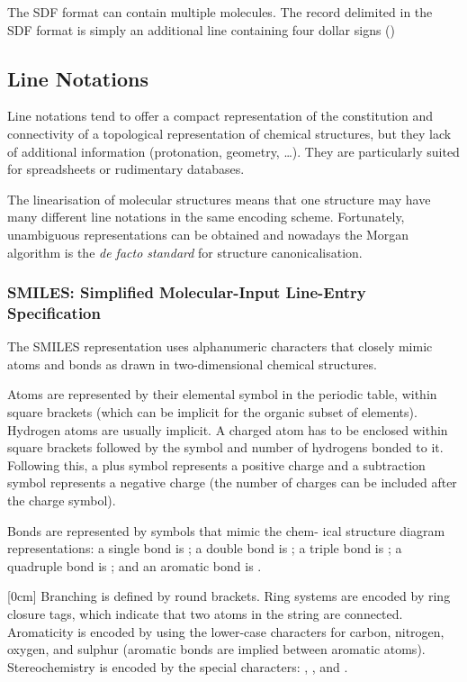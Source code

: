 The SDF format can contain multiple molecules. The record delimited in the SDF format is simply an additional line containing four dollar signs (\code{\$\$\$\$})


\subsection{Line Notations}

Line notations tend to offer a compact representation of the constitution and connectivity of a topological representation of chemical structures, but they lack of additional information (protonation, geometry, \dots). They are particularly suited for spreadsheets or rudimentary databases.

The linearisation of molecular structures means that one structure may have many different line notations in the same encoding scheme. Fortunately, unambiguous representations can be obtained and nowadays the Morgan algorithm is the \emph{de facto standard} for structure canonicalisation.

\subsubsection*{SMILES: Simplified Molecular-Input Line-Entry Specification}

The SMILES representation uses alphanumeric characters that closely mimic atoms and bonds as drawn in two-dimensional chemical structures.

Atoms are represented by their elemental symbol in the periodic table, within square brackets (which can be implicit for the organic subset of elements). Hydrogen atoms are usually implicit. A charged atom has to be enclosed within square brackets followed by the  symbol and number of hydrogens bonded to it. Following this, a plus symbol represents a positive charge and a subtraction symbol represents a negative charge (the number of charges can be included after the charge symbol). 

Bonds are represented by symbols that mimic the chem- ical structure diagram representations: a single bond is \code{-}; a double bond is \code{=}; a triple bond is \code{\#}; a quadruple bond is \code{\$}; and an aromatic bond is \code{:}.

[0cm] 
Branching is defined by round brackets. Ring systems are encoded by ring closure tags, which indicate that two atoms in the string are connected. Aromaticity is encoded by using the lower-case characters for carbon, nitrogen, oxygen, and sulphur (aromatic bonds are implied between aromatic atoms). Stereochemistry is encoded by the special characters: \code{\mybackslash}, \code{/},  and .
